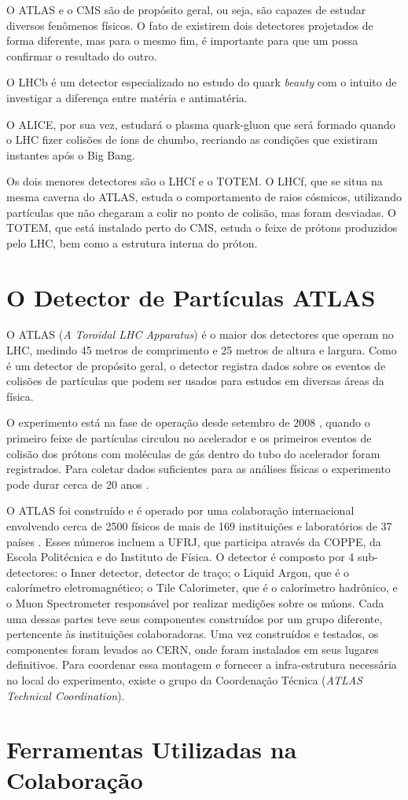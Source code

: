 O ATLAS e o CMS são de propósito geral, ou seja, são capazes de estudar diversos
fenômenos físicos. O fato de existirem dois detectores projetados de forma
diferente, mas para o mesmo fim, é importante para que um possa confirmar o
resultado do outro.

O LHCb é um detector especializado no estudo do quark \textit{beauty} com o
intuito de investigar a diferença entre matéria e antimatéria.

O ALICE, por sua vez, estudará o plasma quark-gluon que será formado quando o
LHC fizer colisões de íons de chumbo, recriando as condições que existiram
instantes após o Big Bang.

Os dois menores detectores são o LHCf e o TOTEM. O LHCf, que se situa na mesma
caverna do ATLAS, estuda o comportamento de raios cósmicos, utilizando
partículas que não chegaram a colir no ponto de colisão, mas foram desviadas.
O TOTEM, que está instalado perto do CMS, estuda o feixe de prótons produzidos
pelo LHC, bem como a estrutura interna do próton.

\section{O Detector de Partículas ATLAS}
\label{sec:ATLAS}

O ATLAS (\textit{A Toroidal LHC Apparatus}) é o maior dos detectores que operam
no LHC, medindo 45 metros de comprimento e 25 metros de altura e largura. Como é
um detector de propósito geral, o detector registra dados sobre os eventos de
colisões de partículas que podem ser usados para estudos em diversas áreas da
física. 

O experimento está na fase de operação desde setembro de 2008 \cite{webLHCFirstBeam},
quando o primeiro feixe de partículas circulou no acelerador e os primeiros
eventos de colisão dos prótons com moléculas de gás dentro do tubo do acelerador
foram registrados. Para coletar dados suficientes para as análises físicas o
experimento pode durar cerca de 20 anos \cite{ATLAS_TDR}.

O ATLAS foi construído e é operado por uma colaboração internacional envolvendo
cerca de 2500 físicos de mais de 169 instituições e laboratórios de 37 países
\cite{webATLAS}. Esses números incluem a UFRJ, que participa através da COPPE,
da Escola Politécnica e do Instituto de Física. O detector é composto por 4
sub-detectores: o Inner detector, detector de traço; o Liquid Argon, que é o
calorímetro eletromagnético; o Tile Calorimeter, que é o calorímetro hadrônico,
e o Muon Spectrometer responsável por realizar medições sobre os múons. Cada uma
dessas partes teve seus componentes construídos por um grupo diferente,
pertencente às instituições colaboradoras.  Uma vez construídos e testados, os
componentes foram levados ao CERN, onde foram instalados em seus lugares
definitivos. Para coordenar essa montagem e fornecer a infra-estrutura
necessária no local do experimento, existe o grupo da Coordenação Técnica
({\it ATLAS Technical Coordination}).

\section{Ferramentas Utilizadas na Colaboração}
\label{sec:ferramentas}

